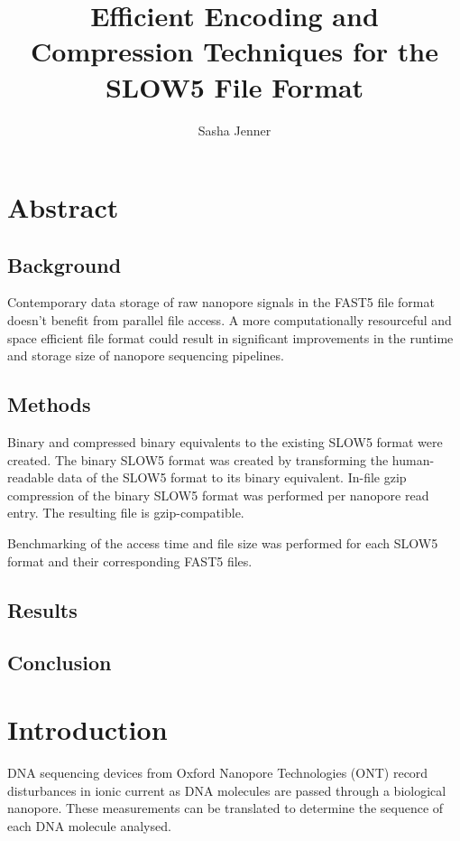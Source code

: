 \documentclass[a4paper, 12pt]{article}
\begin{document}
\title{Efficient Encoding and Compression Techniques for the SLOW5 File Format}
\author{Sasha Jenner}

\maketitle
\tableofcontents
\listoffigures

\section{Abstract}

\subsection{Background}

Contemporary data storage of raw nanopore signals in the FAST5 file format doesn't benefit from parallel file access. A more computationally resourceful and space efficient file format could result in significant improvements in the runtime and storage size of nanopore sequencing pipelines.

\subsection{Methods}

Binary and compressed binary equivalents to the existing SLOW5 format were created. The binary SLOW5 format was created by transforming the human-readable data of the SLOW5 format to its binary equivalent. In-file gzip compression of the binary SLOW5 format was performed per nanopore read entry. The resulting file is gzip-compatible.

Benchmarking of the access time and file size was performed for each SLOW5 format and their corresponding FAST5 files.

\subsection{Results}

\subsection{Conclusion}

\section{Introduction}

DNA sequencing devices from Oxford Nanopore Technologies (ONT) record disturbances in ionic current as DNA molecules are passed through a biological nanopore. These measurements can be translated to determine the sequence of each DNA molecule analysed.
\end{document}
